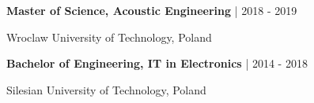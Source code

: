 \textbf{Master of Science, Acoustic Engineering} | 2018 - 2019\par
Wroclaw University of Technology, Poland\par
\textbf{Bachelor of Engineering, IT in Electronics} | 2014 - 2018\par
Silesian University of Technology, Poland
